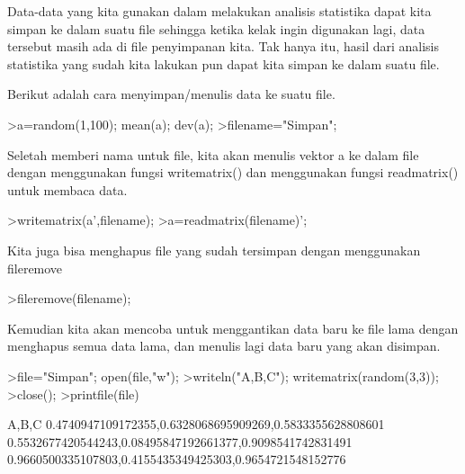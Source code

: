 \documentclass[a4paper,10pt]{article}
\begin{document}
\begin{eulernotebook}
\begin{eulercomment}
\begin{eulercomment}
\begin{eulercomment}
\begin{eulercomment}
\begin{eulercomment}
\begin{eulercomment}
\begin{eulercomment}
\begin{eulercomment}
\begin{eulercomment}
\begin{eulercomment}
\begin{eulercomment}
\begin{eulercomment}
\begin{eulercomment}
\end{eulercomment}
\begin{eulercomment}
Data-data yang kita gunakan dalam melakukan analisis statistika dapat
kita simpan ke dalam suatu file sehingga ketika kelak ingin digunakan
lagi, data tersebut masih ada di file penyimpanan kita. Tak hanya itu,
hasil dari analisis statistika yang sudah kita lakukan pun dapat kita
simpan ke dalam suatu file.

Berikut adalah cara menyimpan/menulis data ke suatu file.
\end{eulercomment}
\begin{eulerprompt}
>a=random(1,100); mean(a); dev(a);
>filename="Simpan";
\end{eulerprompt}
\begin{eulercomment}
Seletah memberi nama untuk file, kita akan menulis vektor a ke dalam
file dengan menggunakan fungsi writematrix() dan menggunakan fungsi
readmatrix() untuk membaca data.
\end{eulercomment}
\begin{eulerprompt}
>writematrix(a',filename);
>a=readmatrix(filename)';
\end{eulerprompt}
\begin{eulercomment}
Kita juga bisa menghapus file yang sudah tersimpan dengan menggunakan
fileremove
\end{eulercomment}
\begin{eulerprompt}
>fileremove(filename);
\end{eulerprompt}
\begin{eulercomment}
Kemudian kita akan mencoba untuk menggantikan data baru ke file lama
dengan menghapus semua data lama, dan menulis lagi data baru yang akan
disimpan.
\end{eulercomment}
\begin{eulerprompt}
>file="Simpan"; open(file,"w");
>writeln("A,B,C"); writematrix(random(3,3));
>close();
>printfile(file)
\end{eulerprompt}
\begin{euleroutput}
  A,B,C
  0.4740947109172355,0.6328068695909269,0.5833355628808601
  0.5532677420544243,0.08495847192661377,0.9098541742831491
  0.9660500335107803,0.4155435349425303,0.9654721548152776
  

\end{euleroutput}
\end{eulercomment}
\end{eulercomment}
\end{eulercomment}
\end{eulercomment}
\end{eulercomment}
\end{eulercomment}
\end{eulercomment}
\end{eulercomment}
\end{eulercomment}
\end{eulercomment}
\end{eulercomment}
\end{eulercomment}
\end{eulernotebook}
\end{document}

